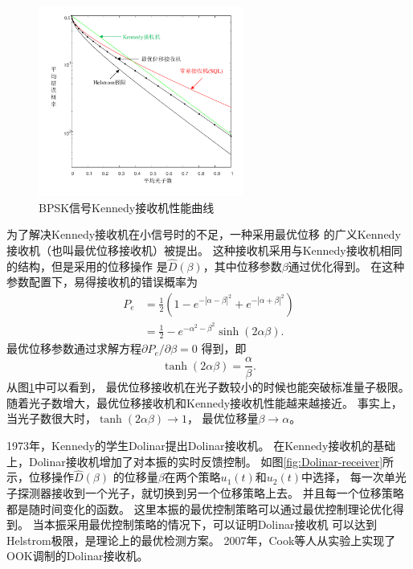 \begin{figure}
\centering
  \includegraphics[width=0.6\textwidth]{figures/chap2/Kennedy-error}
  \caption{BPSK信号Kennedy接收机性能曲线}
  \label{fig:Kennedy-error}
\end{figure}


为了解决Kennedy接收机在小信号时的不足，一种采用最优位移
的广义Kennedy接收机（也叫最优位移接收机）被提出\cite{takeoka2008discrimination}。
这种接收机采用与Kennedy接收机相同的结构，但是采用的位移操作
是$\hat{D}(\beta)$，其中位移参数$\beta$通过优化得到。
在这种参数配置下，易得接收机的错误概率为
\begin{equation}
\begin{split}
P_e &= \frac{1}{2} (1 - e^{-|\alpha-\beta|^2} + e^{-|\alpha+\beta|^2}) \\
    &= \frac{1}{2} - e^{-\alpha^2-\beta^2} \sinh(2\alpha\beta).
\label{eq:BPSK-Opt-Kennedy}
\end{split}
\end{equation}
最优位移参数通过求解方程$\partial P_e / \partial \beta  = 0$
得到，即
\begin{equation}
\tanh(2\alpha\beta) = \frac{\alpha}{\beta}.
\end{equation}
从图\ref{fig:Kennedy-error}中可以看到，
最优位移接收机在光子数较小的时候也能突破标准量子极限。
随着光子数增大，最优位移接收机和Kennedy接收机性能越来越接近。
事实上，当光子数很大时，$\tanh(2\alpha\beta) \rightarrow 1$，
最优位移量$\beta \rightarrow  \alpha$。


1973年，Kennedy的学生Dolinar提出Dolinar接收机。
在Kennedy接收机的基础上，Dolinar接收机增加了对本振的实时反馈控制\cite{dolinar1973optimum}。
如图\ref{fig:Dolinar-receiver}所示，位移操作$\hat{D}(\beta)$
的位移量$\beta$在两个策略$u_1(t)$和$u_2(t)$中选择，
每一次单光子探测器接收到一个光子，就切换到另一个位移策略上去。
并且每一个位移策略都是随时间变化的函数。
这里本振的最优控制策略可以通过最优控制理论优化得到\cite{geremia2004distinguishing}。
当本振采用最优控制策略的情况下，可以证明Dolinar接收机
可以达到Helstrom极限，是理论上的最优检测方案\cite{dolinar1973optimum,geremia2004distinguishing}。
2007年，Cook等人从实验上实现了OOK调制的Dolinar接收机\cite{cook2007optical}。

